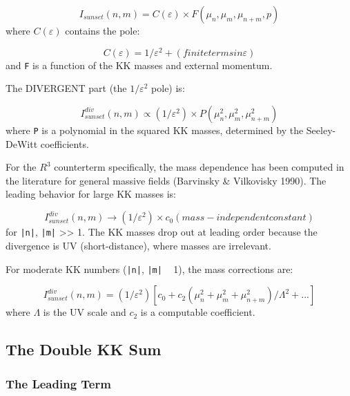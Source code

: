 \documentclass[aps,prd,preprint,superscriptaddress,longbibliography,floatfix]{revtex4-2}
\theoremstyle{remark}
\begin{document}
\begin{equation}
    I_{sunset}(n, m) = C(\varepsilon) \times F(\mu_n, \mu_m, \mu_{n+m}, p)
\end{equation}
where $C(\varepsilon)$ contains the pole:


\begin{equation}
    C(\varepsilon) = 1/\varepsilon^{2} + (finite terms in \varepsilon)
\end{equation}
and \texttt{F} is a function of the KK masses and external momentum.

The DIVERGENT part (the $1/\varepsilon^{2}$ pole) is:


\begin{equation}
    I_{sunset}^{div}(n, m) \propto (1/\varepsilon^{2}) \times P(\mu_n^{2}, \mu_m^{2}, \mu_{n+m}^{2})
\end{equation}
where \texttt{P} is a polynomial in the squared KK masses, determined by the Seeley-DeWitt coefficients.

For the $R^{3}$ counterterm specifically, the mass dependence has been computed in the literature for general massive fields (Barvinsky \& Vilkovisky 1990). The leading behavior for large KK masses is:


\begin{equation}
    I_{sunset}^{div}(n, m) \to (1/\varepsilon^{2}) \times c_{0}     (mass-independent constant)
\end{equation}
for \texttt{|n|}, \texttt{|m|} >> 1. The KK masses drop out at leading order because the divergence is UV (short-distance), where masses are irrelevant.

For moderate KK numbers (\texttt{|n|}, \texttt{|m|} ~ 1), the mass corrections are:


\begin{equation}
    I_{sunset}^{div}(n, m) = (1/\varepsilon^{2}) [c_{0} + c_{2}(\mu_n^{2} + \mu_m^{2} + \mu_{n+m}^{2})/\Lambda^{2} + ...]
\end{equation}
where $\Lambda$ is the UV scale and $c_{2}$ is a computable coefficient.



\subsection{The Double KK Sum}


\subsubsection{The Leading Term}
\end{document}
